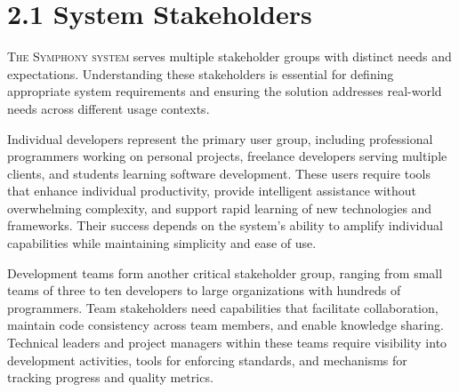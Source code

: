 \clearpage
\section{2.1 System Stakeholders}
\label{sec:system-stakeholders}

\lettrine{T}{he Symphony system} serves multiple stakeholder groups with distinct needs and expectations. Understanding these stakeholders is essential for defining appropriate system requirements and ensuring the solution addresses real-world needs across different usage contexts.

Individual developers represent the primary user group, including professional programmers working on personal projects, freelance developers serving multiple clients, and students learning software development. These users require tools that enhance individual productivity, provide intelligent assistance without overwhelming complexity, and support rapid learning of new technologies and frameworks. Their success depends on the system's ability to amplify individual capabilities while maintaining simplicity and ease of use.

Development teams form another critical stakeholder group, ranging from small teams of three to ten developers to large organizations with hundreds of programmers. Team stakeholders need capabilities that facilitate collaboration, maintain code consistency across team members, and enable knowledge sharing. Technical leaders and project managers within these teams require visibility into development activities, tools for enforcing standards, and mechanisms for tracking progress and quality metrics.
